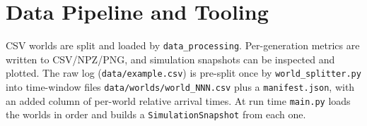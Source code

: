 \section{Data Pipeline and Tooling}
CSV worlds are split and loaded by \texttt{data\_processing}. Per-generation
metrics are written to CSV/NPZ/PNG, and simulation snapshots can be inspected
and plotted. The raw log (\texttt{data/example.csv}) is pre-split once by \texttt{world\_splitter.py} into
time-window files \texttt{data/worlds/world\_NNN.csv} plus a \texttt{manifest.json}, with an added
column of per-world relative arrival times. At run time \texttt{main.py} loads the worlds in order and
builds a \texttt{SimulationSnapshot} from each one.

